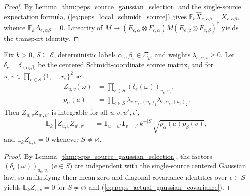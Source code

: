 \begin{proof}\leanok
    By Lemma~\ref{thm:peps_source_gaussian_selection} and the single-source expectation formula, (\ref{eq:peps_local_schmidt_source}) gives $\mathbb E_k\widehat X_{e,\alpha\beta}=X_{e,\alpha\beta}$, whence $\mathbb E_k\Delta_{e,\alpha\beta}=0$. Linearity of $M\mapsto(E_{e,\alpha}\otimes F_{e,\alpha})M(E_{e,\beta}\otimes F_{e,\beta})^{\dagger}$ yields the transport identity.
\end{proof}

\begin{lemma}
    \label{thm:peps_actual_gaussian_covariance}
    \leanok
    Fix $k>0$, $S\subseteq\mathcal E$, deterministic labels $\alpha_e,\beta_e\in\Xi_g$, and weights $\lambda_{e,\alpha,t}\ge 0$. Let $\delta_e=\delta_{e,\alpha_e\beta_e}$ be the centered Schmidt-coordinate source matrix, and for $u,v\in\prod_{e\in S}\{1,\ldots,r_e\}^2$ set
    \begin{align}
        Z_{u,v}(\omega) & =\prod_{e\in S}(\delta_e(\omega))_{u_e,v_e}, \\
        p_{\alpha}(u)   & =\prod_{e\in S}
        \lambda_{e,\alpha_e,(u_e)_1}\lambda_{e,\alpha_e,(u_e)_2}.
    \end{align}
    Then $Z_{u,v}\overline{Z_{u',v'}}$ is integrable for all $u,v,u',v'$,
    \begin{align}
        \mathbb E_k[Z_{u,v}\overline{Z_{u',v'}}]
         & =\mathbf1_{u=u'}\mathbf1_{v=v'}\,
        k^{-|S|}\sqrt{p_{\alpha}(u)p_{\beta}(v)},
        \label{eq:peps_actual_gaussian_covariance}
    \end{align}
    and $\mathbb E_k Z_{u,v}=0$ whenever $S\ne\varnothing$.
\end{lemma}

\begin{proof}\leanok
    By Lemma~\ref{thm:peps_source_gaussian_selection}, the factors $(\delta_e(\omega))_{u_e,v_e}$ ($e\in S$) are independent with the single-source centered Gaussian law, so multiplying their mean-zero and diagonal covariance identities over $e\in S$ yields $\mathbb E_k Z_{u,v}=0$ for $S\ne\varnothing$ and (\ref{eq:peps_actual_gaussian_covariance}).
\end{proof}

